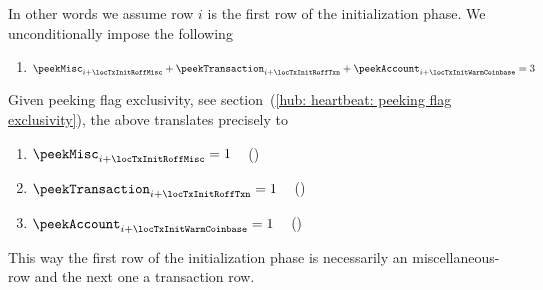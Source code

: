 \begin{center}
\end{center}
In other words we assume row $i$ is the first row of the initialization phase.
We unconditionally impose the following
\begin{enumerate}
	\item 
		\label{hub: initialization phase: the first rows are misc and transaction rows}
		$\peekMisc _{i + \locTxInitRoffMisc} + \peekTransaction _{i + \locTxInitRoffTxn} + \peekAccount _{i + \locTxInitWarmCoinbase} = 3$
\end{enumerate}
Given peeking flag exclusivity,
see section~(\ref{hub: heartbeat: peeking flag exclusivity}),
the above translates precisely to
\begin{enumerate}[resume]
	\item $\peekMisc        _{i + \locTxInitRoffMisc}     = 1$ ~ (\trash)
	\item $\peekTransaction _{i + \locTxInitRoffTxn}      = 1$ ~ (\trash)
	\item $\peekAccount     _{i + \locTxInitWarmCoinbase} = 1$ ~ (\trash)
\end{enumerate}
This way the first row of the initialization phase is necessarily an miscellaneous-row and the next one a transaction row.
